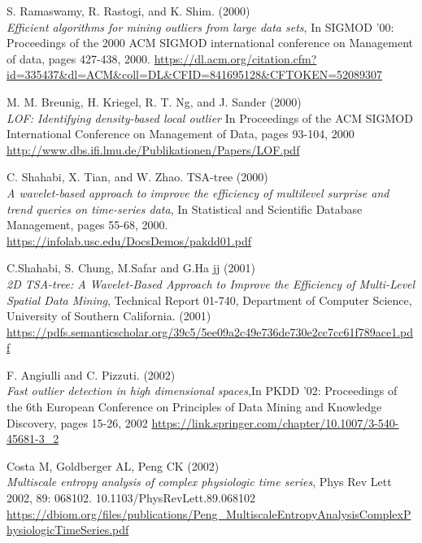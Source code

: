 \documentclass[12pt,a4paper]{article}
\begin{document}
\begin{thebibliography}{9}
S. Ramaswamy, R. Rastogi, and K. Shim. (2000)\\
\textit{Efficient algorithms for mining outliers from large data sets}, In
SIGMOD '00: Proceedings of the 2000 ACM SIGMOD international conference on Management of
data, pages 427-438, 2000.
\url{https://dl.acm.org/citation.cfm?id=335437&dl=ACM&coll=DL&CFID=841695128&CFTOKEN=52089307}

M. M. Breunig, H. Kriegel, R. T. Ng, and J. Sander (2000)\\
\textit{LOF: Identifying density-based local outlier}
In Proceedings of the ACM SIGMOD International Conference on Management of Data, pages 93-104, 2000\\
\url{http://www.dbs.ifi.lmu.de/Publikationen/Papers/LOF.pdf}

C. Shahabi, X. Tian, and W. Zhao. TSA-tree (2000)\\
\textit{A wavelet-based approach to improve the efficiency of multilevel surprise and trend queries on time-series data},
In Statistical and Scientific Database Management, pages 55-68, 2000.\\
\url{https://infolab.usc.edu/DocsDemos/pakdd01.pdf}

C.Shahabi, S. Chung, M.Safar and G.Ha jj (2001)\\
\textit{2D TSA-tree: A Wavelet-Based Approach to Improve the Efficiency of Multi-Level Spatial Data Mining},
Technical Report 01-740, Department of Computer Science, University of Southern California. (2001)\\
\url{https://pdfs.semanticscholar.org/39c5/5ee09a2c49e736de730e2cc7cc61f789ace1.pdf}

F. Angiulli and C. Pizzuti. (2002)\\
\textit{Fast outlier detection in high dimensional spaces},In PKDD '02: Proceedings
of the 6th European Conference on Principles of Data Mining and Knowledge Discovery, pages 15-26,
2002
\url{https://link.springer.com/chapter/10.1007/3-540-45681-3_2}

Costa M, Goldberger AL, Peng CK (2002)\\
\textit{Multiscale entropy analysis of complex physiologic time series},
Phys Rev Lett 2002, 89: 068102. 10.1103/PhysRevLett.89.068102\\
\url{https://dbiom.org/files/publications/Peng_MultiscaleEntropyAnalysisComplexPhysiologicTimeSeries.pdf}


\end{thebibliography}
\end{document}
